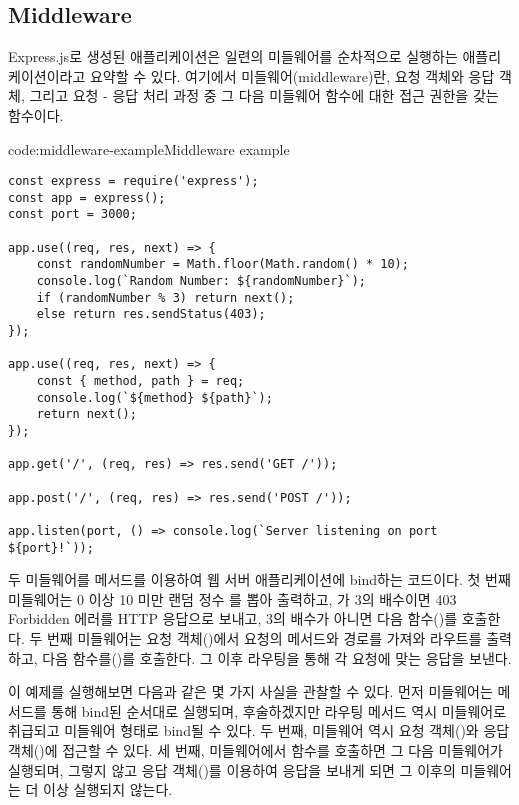\subsection*{Middleware}

Express.js로 생성된 애플리케이션은 일련의 미들웨어를 순차적으로 실행하는 애플리케이션이라고 요약할 수 있다. 여기에서 미들웨어(middleware)란, 요청 객체와 응답 객체, 그리고 요청 - 응답 처리 과정 중 그 다음 미들웨어 함수에 대한 접근 권한을 갖는 함수이다.

\begin{code}{code:middleware-example}{Middleware example}
\begin{verbatim}
const express = require('express');
const app = express();
const port = 3000;

app.use((req, res, next) => {
    const randomNumber = Math.floor(Math.random() * 10);
    console.log(`Random Number: ${randomNumber}`);
    if (randomNumber % 3) return next();
    else return res.sendStatus(403);
});

app.use((req, res, next) => {
    const { method, path } = req;
    console.log(`${method} ${path}`);
    return next();
});

app.get('/', (req, res) => res.send('GET /'));

app.post('/', (req, res) => res.send('POST /'));

app.listen(port, () => console.log(`Server listening on port ${port}!`));
\end{verbatim}
\end{code}

\은 두 미들웨어를  메서드를 이용하여 웹 서버 애플리케이션에 bind하는 코드이다. 첫 번째 미들웨어는 0 이상 10 미만 랜덤 정수 를 뽑아 출력하고, 가 3의 배수이면 403 Forbidden 에러를 HTTP 응답으로 보내고, 3의 배수가 아니면 다음 함수()를 호출한다. 두 번째 미들웨어는 요청 객체()에서 요청의 메서드와 경로를 가져와 라우트를 출력하고, 다음 함수를()를 호출한다. 그 이후 라우팅을 통해 각 요청에 맞는 응답을 보낸다.

이 예제를 실행해보면 다음과 같은 몇 가지 사실을 관찰할 수 있다. 먼저 미들웨어는  메서드를 통해 bind된 순서대로 실행되며, 후술하겠지만 라우팅 메서드 역시 미들웨어로 취급되고 미들웨어 형태로 bind될 수 있다. 두 번째, 미들웨어 역시 요청 객체()와 응답 객체()에 접근할 수 있다. 세 번째, 미들웨어에서  함수를 호출하면 그 다음 미들웨어가 실행되며, 그렇지 않고 응답 객체()를 이용하여 응답을 보내게 되면 그 이후의 미들웨어는 더 이상 실행되지 않는다.

